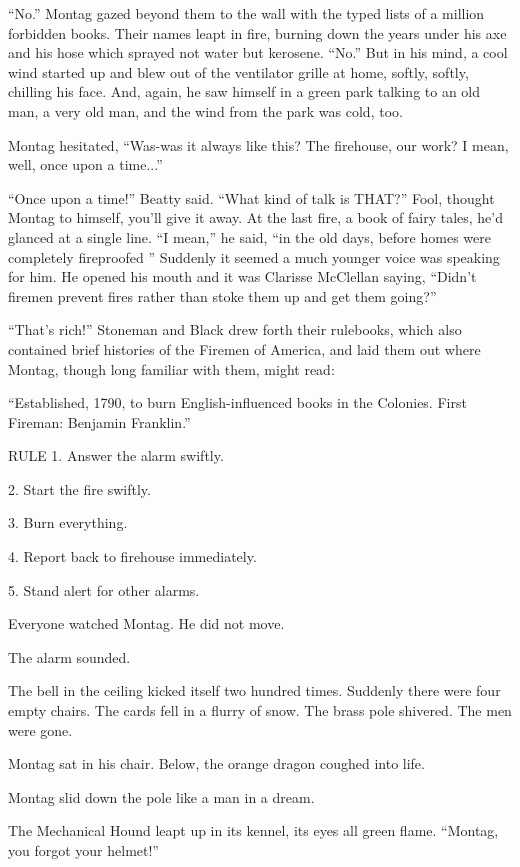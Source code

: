 \documentclass[11pt,openany]{book}
\begin{document}
``No.'' Montag gazed beyond them to the wall with the typed lists of a million forbidden books. Their names leapt in fire, burning down the years under his axe and his hose which sprayed not water but kerosene. ``No.'' But in his mind, a cool wind started up and blew out of the ventilator grille at home, softly, softly, chilling his face. And, again, he saw himself in a green park talking to an old man, a very old man, and the wind from the park was cold, too.

Montag hesitated, ``Was-was it always like this? The firehouse, our work? I mean, well, once upon a time...''

``Once upon a time!'' Beatty said. ``What kind of talk is THAT?'' Fool, thought Montag to himself, you'll give it away. At the last fire, a book of fairy tales, he'd glanced at a single line. ``I mean,'' he said, ``in the old days, before homes were completely fireproofed '' Suddenly it seemed a much younger voice was speaking for him. He opened his mouth and it was Clarisse McClellan saying, ``Didn't firemen prevent fires rather than stoke them up and get them going?''

``That's rich!'' Stoneman and Black drew forth their rulebooks, which also contained brief histories of the Firemen of America, and laid them out where Montag, though long familiar with them, might read:

``Established, 1790, to burn English-influenced books in the Colonies. First Fireman: Benjamin Franklin.''

RULE 1. Answer the alarm swiftly.

2. Start the fire swiftly.

3. Burn everything.

4. Report back to firehouse immediately.

5. Stand alert for other alarms.

Everyone watched Montag. He did not move.

The alarm sounded.

The bell in the ceiling kicked itself two hundred times. Suddenly there were four empty chairs. The cards fell in a flurry of snow. The brass pole shivered. The men were gone.

Montag sat in his chair. Below, the orange dragon coughed into life.

Montag slid down the pole like a man in a dream.

The Mechanical Hound leapt up in its kennel, its eyes all green flame. ``Montag, you forgot your helmet!''
\end{document}
